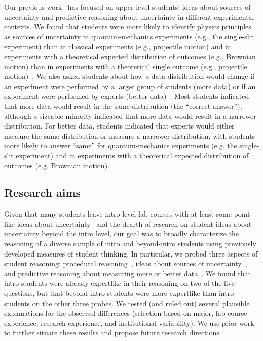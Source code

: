 \documentclass[english,aps,prstper,reprint,showpacs,longbibliography,superscriptaddress,nofootinbib]{revtex4-2}
\begin{document}
Our previous work~\cite{Stein2019,Stump2020,White2020,StumpTBD,SchangTBD} has focused on upper-level students' ideas about sources of uncertainty and predictive reasoning about uncertainty in different experimental contexts. We found that students were more likely to identify physics principles as sources of uncertainty in quantum-mechanics experiments (e.g., the single-slit experiment) than in classical experiments (e.g., projectile motion) and in experiments with a theoretical expected distribution of outcomes (e.g., Brownian motion) than in experiments with a theoretical single outcome (e.g., projectile motion)~\cite{Stein2019,Stump2020,StumpTBD}. We also asked students about how a data distribution would change if an experiment were performed by a larger group of students (more data) or if an experiment were performed by experts (better data)~\cite{Stein2019,White2020,SchangTBD}. Most students indicated that more data would result in the same distribution (the ``correct answer''), although a sizeable minority indicated that more data would result in a narrower distribution. For better data, students indicated that experts would either measure the same distribution or measure a narrower distribution, with students more likely to answer ``same'' for quantum-mechanics experiments (e.g. the single-slit experiment) and in experiments with a theoretical expected distribution of outcomes (e.g. Brownian motion).

\subsection{Research aims}

Given that many students leave intro-level lab courses with at least some point-like ideas about uncertainty~\cite{Kung2005,Volkwyn2008,Wan2022,Pollard2020,Kung2006,Pillay2008} and the dearth of research on student ideas about uncertainty beyond the intro level, our goal was to broadly characterize the reasoning of a diverse sample of intro and beyond-intro students using previously developed measures of student thinking. In particular, we probed three aspects of student reasoning: procedural reasoning~\cite{Allie1998,Buffler2001,Lubben2001}, ideas about sources of uncertainty~\cite{StumpTBD}, and predictive reasoning about measuring more or better data~\cite{SchangTBD}. We found that intro students were already expertlike in their reasoning on two of the five questions, but that beyond-intro students were more expertlike than intro students on the other three probes. We tested (and ruled out) several plausible explanations for the observed differences (selection based on major, lab course experience, research experience, and institutional variability). We use prior work to further situate these results and propose future research directions.
\end{document}

